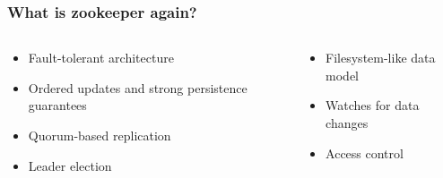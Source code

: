 \begin{frame}
	\frametitle{What is zookeeper again?}
	\begin{columns}[c]
		\begin{column}{0.45\textwidth}
			\begin{block}[Distributed]
				\begin{itemize}
					\item Fault-tolerant architecture
					\item Ordered updates and strong persistence guarantees
					\item Quorum-based replication
					\item Leader election
				\end{itemize}
			\end{block}
		\end{column}
		\begin{column}{0.45\textwidth}
			\begin{block}
				\begin{itemize}
					\item Filesystem-like data model
					\item Watches for data changes
					\item Access control
				\end{itemize}
			\end{block}
		\end{column}
	\end{columns}
\end{frame}

